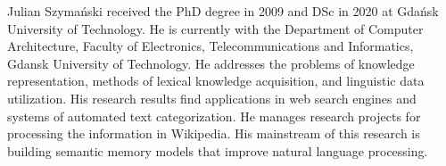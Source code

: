 \documentclass[preprint,3p]{elsarticle}
\begin{document}
{Julian Szyma{\'n}ski}  received the PhD degree in 2009 and DSc in 2020 at Gdańsk University of Technology.
He is currently with the Department of Computer
Architecture, Faculty of Electronics, Telecommunications and Informatics, Gdansk University of Technology. He addresses the problems of knowledge representation, methods of lexical knowledge acquisition, and linguistic data utilization.
His research results find applications in web search engines and systems of automated text categorization. He manages research projects for processing the information in Wikipedia. His mainstream of this research is building semantic memory models that improve natural language processing.  
\end{document}

